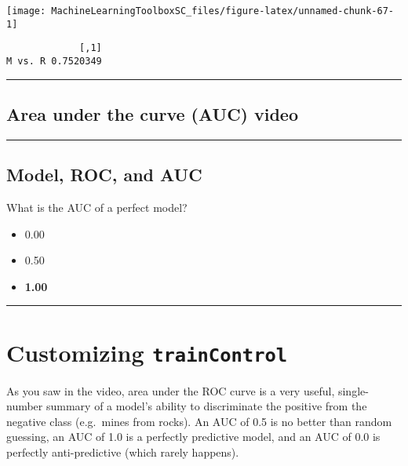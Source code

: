 \documentclass[
]{book}
\begin{document}
\begin{center}\texttt{[image: MachineLearningToolboxSC\_files/figure-latex/unnamed-chunk-67-1]} \end{center}

\begin{verbatim}
             [,1]
M vs. R 0.7520349
\end{verbatim}

\begin{center}\rule{0.5\linewidth}{0.5pt}\end{center}

\hypertarget{area-under-the-curve-auc-video}{%
\subsection*{Area under the curve (AUC) video}\label{area-under-the-curve-auc-video}}

\begin{center}\rule{0.5\linewidth}{0.5pt}\end{center}

\hypertarget{model-roc-and-auc}{%
\subsection*{Model, ROC, and AUC}\label{model-roc-and-auc}}

What is the AUC of a perfect model?

\begin{itemize}
\item
  0.00
\item
  0.50
\item
  \textbf{1.00}
\end{itemize}

\begin{center}\rule{0.5\linewidth}{0.5pt}\end{center}

\hypertarget{customizing-traincontrol}{%
\section{\texorpdfstring{Customizing \texttt{trainControl}}{Customizing trainControl}}\label{customizing-traincontrol}}

As you saw in the video, area under the ROC curve is a very useful, single-number summary of a model's ability to discriminate the positive from the negative class (e.g.~mines from rocks). An AUC of 0.5 is no better than random guessing, an AUC of 1.0 is a perfectly predictive model, and an AUC of 0.0 is perfectly anti-predictive (which rarely happens).
\end{document}
